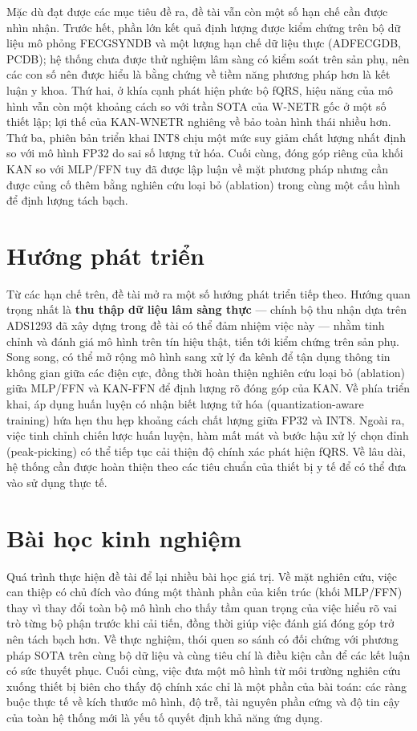\documentclass[../DoAn.tex]{subfiles}
\begin{document}
Mặc dù đạt được các mục tiêu đề ra, đề tài vẫn còn một số hạn chế cần được nhìn nhận. Trước hết, phần lớn kết quả định lượng được kiểm chứng trên bộ dữ liệu mô phỏng FECGSYNDB và một lượng hạn chế dữ liệu thực (ADFECGDB, PCDB); hệ thống chưa được thử nghiệm lâm sàng có kiểm soát trên sản phụ, nên các con số nên được hiểu là bằng chứng về tiềm năng phương pháp hơn là kết luận y khoa. Thứ hai, ở khía cạnh phát hiện phức bộ fQRS, hiệu năng của mô hình vẫn còn một khoảng cách so với trần SOTA của W-NETR gốc ở một số thiết lập; lợi thế của KAN-WNETR nghiêng về bảo toàn hình thái nhiều hơn. Thứ ba, phiên bản triển khai INT8 chịu một mức suy giảm chất lượng nhất định so với mô hình FP32 do sai số lượng tử hóa. Cuối cùng, đóng góp riêng của khối KAN so với MLP/FFN tuy đã được lập luận về mặt phương pháp nhưng cần được củng cố thêm bằng nghiên cứu loại bỏ (ablation) trong cùng một cấu hình để định lượng tách bạch.

\section{Hướng phát triển}

Từ các hạn chế trên, đề tài mở ra một số hướng phát triển tiếp theo. Hướng quan trọng nhất là \textbf{thu thập dữ liệu lâm sàng thực} --- chính bộ thu nhận dựa trên ADS1293 đã xây dựng trong đề tài có thể đảm nhiệm việc này --- nhằm tinh chỉnh và đánh giá mô hình trên tín hiệu thật, tiến tới kiểm chứng trên sản phụ. Song song, có thể mở rộng mô hình sang xử lý đa kênh để tận dụng thông tin không gian giữa các điện cực, đồng thời hoàn thiện nghiên cứu loại bỏ (ablation) giữa MLP/FFN và KAN-FFN để định lượng rõ đóng góp của KAN. Về phía triển khai, áp dụng huấn luyện có nhận biết lượng tử hóa (quantization-aware training) hứa hẹn thu hẹp khoảng cách chất lượng giữa FP32 và INT8. Ngoài ra, việc tinh chỉnh chiến lược huấn luyện, hàm mất mát và bước hậu xử lý chọn đỉnh (peak-picking) có thể tiếp tục cải thiện độ chính xác phát hiện fQRS. Về lâu dài, hệ thống cần được hoàn thiện theo các tiêu chuẩn của thiết bị y tế để có thể đưa vào sử dụng thực tế.

\section{Bài học kinh nghiệm}

Quá trình thực hiện đề tài để lại nhiều bài học giá trị. Về mặt nghiên cứu, việc can thiệp có chủ đích vào đúng một thành phần của kiến trúc (khối MLP/FFN) thay vì thay đổi toàn bộ mô hình cho thấy tầm quan trọng của việc hiểu rõ vai trò từng bộ phận trước khi cải tiến, đồng thời giúp việc đánh giá đóng góp trở nên tách bạch hơn. Về thực nghiệm, thói quen so sánh có đối chứng với phương pháp SOTA trên cùng bộ dữ liệu và cùng tiêu chí là điều kiện cần để các kết luận có sức thuyết phục. Cuối cùng, việc đưa một mô hình từ môi trường nghiên cứu xuống thiết bị biên cho thấy độ chính xác chỉ là một phần của bài toán: các ràng buộc thực tế về kích thước mô hình, độ trễ, tài nguyên phần cứng và độ tin cậy của toàn hệ thống mới là yếu tố quyết định khả năng ứng dụng.
\end{document}
